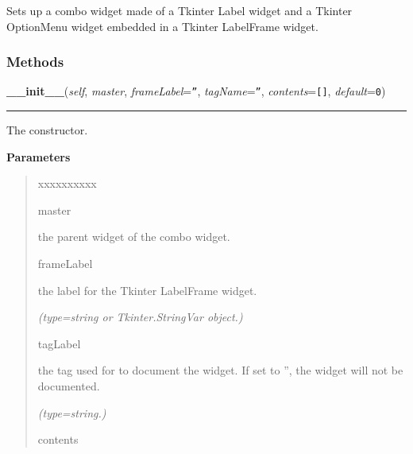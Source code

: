 Sets up a combo widget made of a Tkinter Label widget and a Tkinter 
OptionMenu widget embedded in a Tkinter LabelFrame widget.



  \subsubsection{Methods}

    \vspace{0.5ex}

\hspace{.8\funcindent}\begin{boxedminipage}{\funcwidth}

    \raggedright \textbf{\_\_init\_\_}(\textit{self}, \textit{master}, \textit{frameLabel}={\tt ''}, \textit{tagName}={\tt ''}, \textit{contents}={\tt []}, \textit{default}={\tt 0})

    \vspace{-1.5ex}

    \rule{\textwidth}{0.5\fboxrule}
\setlength{\parskip}{2ex}
    The constructor.

\setlength{\parskip}{1ex}
      \textbf{Parameters}
      \vspace{-1ex}

      \begin{quote}
        \begin{Ventry}{xxxxxxxxxx}

          \item[master]

          the parent widget of the combo widget.

          \item[frameLabel]

          the label for the Tkinter LabelFrame widget.

            {\it (type=string or Tkinter.StringVar object.)}

          \item[tagLabel]

          the tag used for to document the widget. If set to '', the widget
          will not be documented.

            {\it (type=string.)}

          \item[contents]


\end{Ventry}
\end{quote}
\end{boxedminipage}
